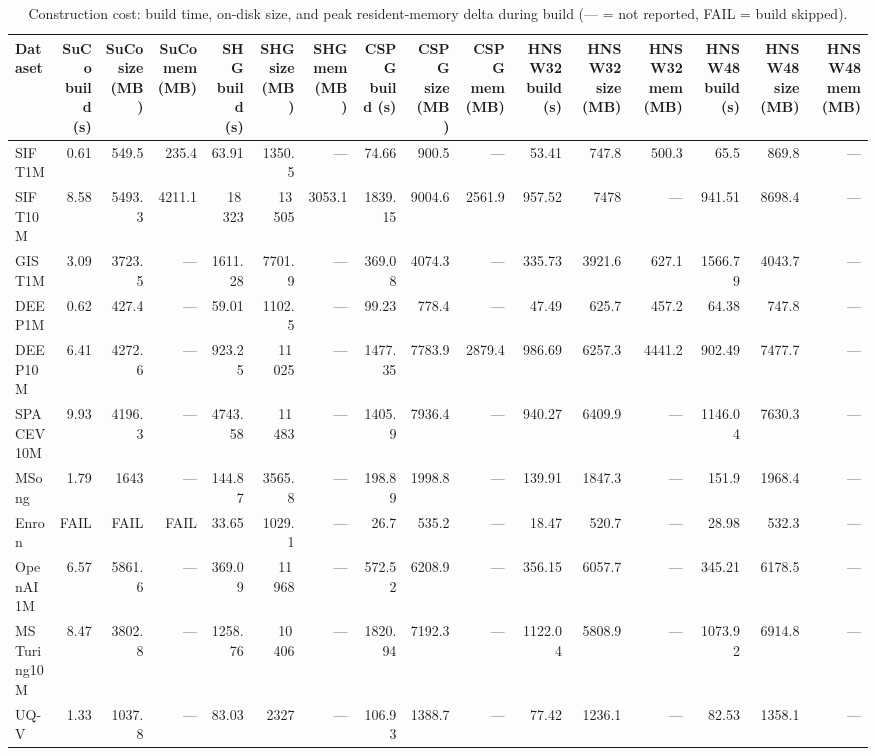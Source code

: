 \begin{table}[t]
\centering
\small
\caption{Construction cost: build time, on-disk size, and peak resident-memory delta during build (— = not reported, FAIL = build skipped).}
\label{tab:construction}
\begin{tabular}{lrrrrrrrrrrrrrrr}
\toprule
Dataset & SuCo build (s) & SuCo size (MB) & SuCo mem (MB) & SHG build (s) & SHG size (MB) & SHG mem (MB) & CSPG build (s) & CSPG size (MB) & CSPG mem (MB) & HNSW32 build (s) & HNSW32 size (MB) & HNSW32 mem (MB) & HNSW48 build (s) & HNSW48 size (MB) & HNSW48 mem (MB) \\
\midrule
SIFT1M & 0.61 & 549.5 & 235.4 & 63.91 & 1350.5 & — & 74.66 & 900.5 & — & 53.41 & 747.8 & 500.3 & 65.5 & 869.8 & — \\
SIFT10M & 8.58 & 5493.3 & 4211.1 & 18\,323 & 13\,505 & 3053.1 & 1839.15 & 9004.6 & 2561.9 & 957.52 & 7478 & — & 941.51 & 8698.4 & — \\
GIST1M & 3.09 & 3723.5 & — & 1611.28 & 7701.9 & — & 369.08 & 4074.3 & — & 335.73 & 3921.6 & 627.1 & 1566.79 & 4043.7 & — \\
DEEP1M & 0.62 & 427.4 & — & 59.01 & 1102.5 & — & 99.23 & 778.4 & — & 47.49 & 625.7 & 457.2 & 64.38 & 747.8 & — \\
DEEP10M & 6.41 & 4272.6 & — & 923.25 & 11\,025 & — & 1477.35 & 7783.9 & 2879.4 & 986.69 & 6257.3 & 4441.2 & 902.49 & 7477.7 & — \\
SPACEV10M & 9.93 & 4196.3 & — & 4743.58 & 11\,483 & — & 1405.9 & 7936.4 & — & 940.27 & 6409.9 & — & 1146.04 & 7630.3 & — \\
MSong & 1.79 & 1643 & — & 144.87 & 3565.8 & — & 198.89 & 1998.8 & — & 139.91 & 1847.3 & — & 151.9 & 1968.4 & — \\
Enron & FAIL & FAIL & FAIL & 33.65 & 1029.1 & — & 26.7 & 535.2 & — & 18.47 & 520.7 & — & 28.98 & 532.3 & — \\
OpenAI1M & 6.57 & 5861.6 & — & 369.09 & 11\,968 & — & 572.52 & 6208.9 & — & 356.15 & 6057.7 & — & 345.21 & 6178.5 & — \\
MSTuring10M & 8.47 & 3802.8 & — & 1258.76 & 10\,406 & — & 1820.94 & 7192.3 & — & 1122.04 & 5808.9 & — & 1073.92 & 6914.8 & — \\
UQ-V & 1.33 & 1037.8 & — & 83.03 & 2327 & — & 106.93 & 1388.7 & — & 77.42 & 1236.1 & — & 82.53 & 1358.1 & — \\
\bottomrule
\end{tabular}
\end{table}
